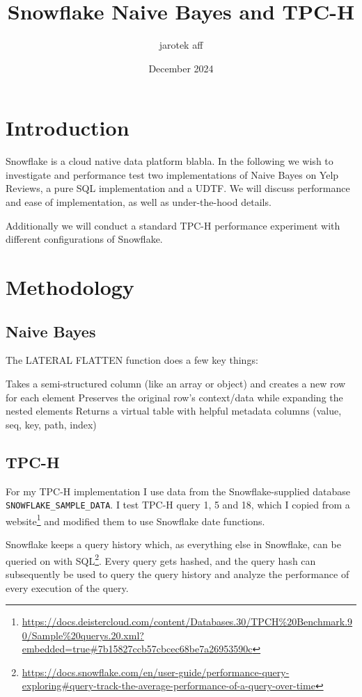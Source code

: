 \documentclass{article}
\title{Snowflake Naive Bayes and TPC-H}
\author{jarotek aff}
\date{December 2024}
\begin{document}
\maketitle

\section{Introduction}
Snowflake\cite{snowflake_2016} is a cloud native data platform blabla. 
In the following we wish to investigate and performance test two implementations of Naive Bayes on Yelp Reviews, a pure SQL implementation and a UDTF. We will discuss performance and ease of implementation, as well as under-the-hood details. 

\bigskip
Additionally we will conduct a standard TPC-H performance experiment with different configurations of Snowflake. 

\section{Methodology}

\subsection{Naive Bayes}
The LATERAL FLATTEN function does a few key things:

Takes a semi-structured column (like an array or object) and creates a new row for each element
Preserves the original row's context/data while expanding the nested elements
Returns a virtual table with helpful metadata columns (value, seq, key, path, index)

\subsection{TPC-H}
For my TPC-H implementation I use data from the Snowflake-supplied database \texttt{SNOWFLAKE\_SAMPLE\_DATA}. I test TPC-H query 1, 5 and 18, which I copied from a website\footnote{\url{https://docs.deistercloud.com/content/Databases.30/TPCH\%20Benchmark.90/Sample\%20querys.20.xml?embedded=true\#7b15827ccb57cbcec68be7a26953590c}} and modified them to use Snowflake date functions. 

\medskip \noindent Snowflake keeps a query history which, as everything else in Snowflake, can be queried on with SQL\footnote{\url{https://docs.snowflake.com/en/user-guide/performance-query-exploring#query-track-the-average-performance-of-a-query-over-time}}. Every query gets hashed, and the query hash can subsequently be used to query the query history and analyze the performance of every execution of the query.
\end{document}
